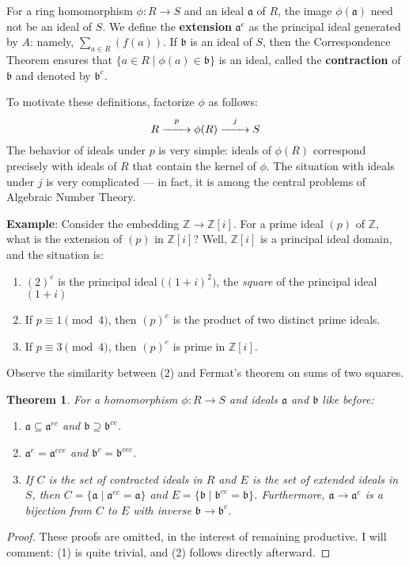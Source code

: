 \documentclass[11pt]{article}
\newtheorem{theorem}{Theorem}
\renewcommand{\longrightarrow}{\xrightarrow{\hspace*{0.7cm}}}
\begin{document}
For a ring homomorphism $\phi : R \to S$ and an ideal $\mathfrak{a}$ of $R$, the image $\phi(\mathfrak{a})$ need not be an ideal of $S$. We define the \textbf{extension} $\mathfrak{a}^{e}$ as the principal ideal generated by $A$: namely, $\sum_{a \in R} (f(a))$. If $\mathfrak{b}$ is an ideal of $S$, then the Correspondence Theorem ensures that $\{ a \in R \mid \phi(a) \in \mathfrak{b} \}$ is an ideal, called the \textbf{contraction} of $\mathfrak{b}$ and denoted by $\mathfrak{b}^{c}$.

To motivate these definitions, factorize $\phi$ as follows:
\[
	R \stackrel{p}{\longrightarrow}\phi(R) \stackrel{j}{\longrightarrow} S
\]
The behavior of ideals under $p$ is very simple: ideals of $\phi(R)$ correspond precisely with ideals of $R$ that contain the kernel of $\phi$. The situation with ideals under $j$ is very complicated --- in fact, it is among the central problems of Algebraic Number Theory.

\textbf{Example}: Consider the embedding $\mathbb{Z} \to \mathbb{Z}[i]$. For a prime ideal $(p)$ of $\mathbb{Z}$, what is the extension of $(p)$ in $\mathbb{Z}[i]$? Well, $\mathbb{Z}[i]$ is a principal ideal domain, and the situation is:
\begin{enumerate}
	\item $(2)^{e}$ is the principal ideal $\Big( (1 + i)^{2} \Big)$, the \textit{square} of the principal ideal $(1 + i)$
	\item If $p \equiv 1 \pmod{4}$, then $(p)^{e}$ is the product of two distinct prime ideals.
	\item If $p \equiv 3 \pmod{4}$, then $(p)^{e}$ is prime in $\mathbb{Z}[i]$.
\end{enumerate}
Observe the similarity between (2) and Fermat's theorem on sums of two squares.

\begin{adjustwidth}{0.5cm}{}
	\begin{theorem}
		For a homomorphism $\phi : R \to S$ and ideals $\mathfrak{a}$ and $\mathfrak{b}$ like before:
		\begin{enumerate}
			\item $\mathfrak{a} \subseteq \mathfrak{a}^{ec}$ and $\mathfrak{b} \supseteq \mathfrak{b}^{ce}$.
			\item $\mathfrak{a}^{e} = \mathfrak{a}^{ece}$ and $\mathfrak{b}^{c} = \mathfrak{b}^{cec}$.
			\item If $C$ is the set of contracted ideals in $R$ and $E$ is the set of extended ideals in $S$, then $C = \{ \mathfrak{a} \mid \mathfrak{a}^{ec} = \mathfrak{a} \}$ and $E = \{ \mathfrak{b} \mid \mathfrak{b}^{ce} = \mathfrak{b} \}$. Furthermore, $\mathfrak{a} \to \mathfrak{a}^{e}$ is a bijection from $C$ to $E$ with inverse $\mathfrak{b} \to \mathfrak{b}^{c}$.
		\end{enumerate}
	\end{theorem}
	\begin{proof}
		These proofs are omitted, in the interest of remaining productive. I will comment: (1) is quite trivial, and (2) follows directly afterward.
	\end{proof}
\end{adjustwidth}
\end{document}
